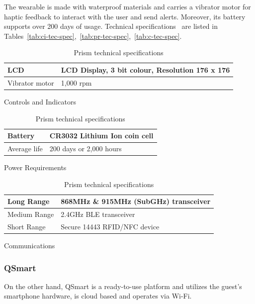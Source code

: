 The wearable is made with waterproof materials and carries a vibrator motor for haptic feedback to interact with the user and send alerts.
Moreover, its battery supports over 200 days of usage.
Technical specifications~\cite{prism-manual} are listed in Tables~\ref{tab:ci-tec-spec},~\ref{tab:pr-tec-spec},~\ref{tab:c-tec-spec}.

\begin{table}[H]
	\centering
	\begin{subtable}[t]{0.85\textwidth}
		\centering
		\begin{tabular}{|l|l|}
			\hline
			LCD            & LCD Display, 3 bit colour, Resolution 176 x 176 \\ \hline
			Vibrator motor & 1,000 rpm                                       \\
			\hline
		\end{tabular}
		\caption{Controls and Indicators}
		\label{tab:ci-tec-spec}
	\end{subtable}
	\begin{subtable}[t]{0.85\textwidth}
		\centering
		\begin{tabular}{|l|l|}
			\hline
			Battery      & CR3032 Lithium Ion coin cell \\ \hline
			Average life & 200 days or 2,000 hours      \\
			\hline
		\end{tabular}
		\caption{Power Requirements}
		\label{tab:pr-tec-spec}
	\end{subtable}
	\begin{subtable}[t]{0.85\textwidth}
		\centering
		\begin{tabular}{|l|l|}
			\hline
			Long Range   & 868MHz \& 915MHz (SubGHz) transceiver \\ \hline
			Medium Range & 2.4GHz BLE transceiver                \\ \hline
			Short Range  & Secure 14443 RFID/NFC device          \\
			\hline
		\end{tabular}
		\caption{Communications}
		\label{tab:c-tec-spec}
	\end{subtable}
	\caption{Prism technical specifications}
	\label{tab:prism-tech-spec}
\end{table}

\subsubsection*{QSmart}
On the other hand, QSmart is a ready-to-use platform and utilizes the guest's smartphone hardware, is cloud based
and operates via Wi-Fi.

